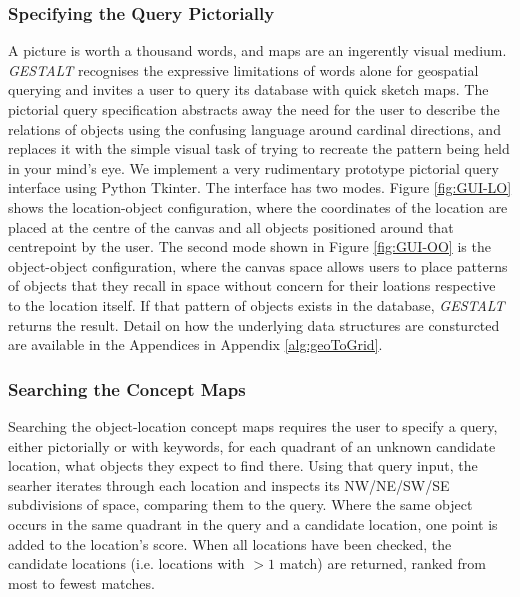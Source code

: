 \subsubsection{Specifying the Query Pictorially}
A picture is worth a thousand words, and maps are an ingerently visual medium. \emph{GESTALT} recognises the expressive limitations of words alone for geospatial querying and invites a user to query its database with quick sketch maps. 
The pictorial query specification abstracts away the need for the user to describe the relations of objects using the confusing language around cardinal directions, and replaces it with the simple visual task of trying to recreate the pattern being held in your mind's eye.
We implement a very rudimentary prototype pictorial query interface using Python Tkinter.
The interface has two modes. 
Figure \ref{fig:GUI-LO} shows the location-object configuration, where the coordinates of the location are placed at the centre of the canvas and all objects positioned around that centrepoint by the user. 
The second mode shown in Figure \ref{fig:GUI-OO} is the object-object configuration, where the canvas space allows users to place patterns of objects that they recall in space without concern for their loations respective to the location itself. If that pattern of objects exists in the database, \emph{GESTALT} returns the result. Detail on how the underlying data structures are consturcted are available in the Appendices in Appendix \ref{alg:geoToGrid}.

\subsubsection{Searching the Concept Maps}
Searching the object-location concept maps requires the user to specify a query, either pictorially or with keywords, for each quadrant of an unknown candidate location, what objects they expect to find there.
Using that query input, the searher iterates through each location and inspects its NW/NE/SW/SE subdivisions of space, comparing them to the query. 
Where the same object occurs in the same quadrant in the query and a candidate location, one point is added to the location's score. 
When all locations have been checked, the candidate locations (i.e. locations with $> 1$ match) are returned, ranked from most to fewest matches. 

